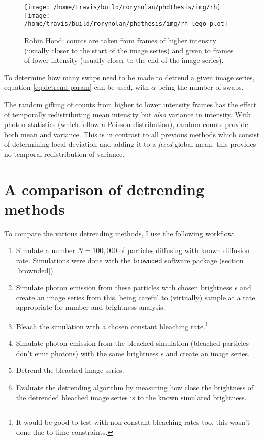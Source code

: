\documentclass[12pt,]{book}
\providecommand{\tightlist}{%
  \setlength{\itemsep}{0pt}\setlength{\parskip}{0pt}}
\let\rmarkdownfootnote\footnote%
\def\footnote{\protect\rmarkdownfootnote}
\theoremstyle{definition}
\theoremstyle{definition}
\theoremstyle{definition}
\theoremstyle{remark}
\begin{document}
\begin{figure}

\texttt{[image: /home/travis/build/rorynolan/phdthesis/img/rh]} \texttt{[image: /home/travis/build/rorynolan/phdthesis/img/rh\_lego\_plot]} \hfill{}

\caption{Robin Hood: counts are taken from frames of higher
intensity (usually closer to the start of the image series) and given to
frames of lower intensity (usually closer to the end of the image
series).}\label{fig:rh-lego}
\end{figure}

To determine how many swaps need to be made to detrend a given image
series, equation \eqref{eq:detrend-param} can be used, with \(\alpha\)
being the number of swaps.

The random gifting of counts from higher to lower intensity frames has
the effect of temporally redistributing mean intensity but \emph{also}
variance in intensity. With photon statistics (which follow a Poisson
distribution), random counts provide both mean and variance. This is in
contrast to all previous methods which consist of determining local
deviation and adding it to a \emph{fixed} global mean: this provides no
temporal redistribution of variance.

\section{A comparison of detrending methods}\label{detrend-compare}

To compare the various detrending methods, I use the following workflow:

\begin{enumerate}
\def\labelenumi{\arabic{enumi}.}
\tightlist
\item
  Simulate a number \(N = 100,000\) of particles diffusing with known
  diffusion rate. Simulations were done with the \texttt{brownded}
  software package (section \ref{brownded}).
\item
  Simulate photon emission from these particles with chosen brightness
  \(\epsilon\) and create an image series from this, being careful to
  (virtually) sample at a rate appropriate for number and brightness
  analysis.
\item
  Bleach the simulation with a chosen constant bleaching rate.\footnote{It
    would be good to test with non-constant bleaching rates too, this
    wasn't done due to time constraints.}
\item
  Simulate photon emission from the bleached simulation (bleached
  particles don't emit photons) with the same brightness \(\epsilon\)
  and create an image series.
\item
  Detrend the bleached image series.
\item
  Evaluate the detrending algorithm by measuring how close the
  brightness of the detrended bleached image series is to the known
  simulated brightness.
\end{enumerate}
\end{document}
